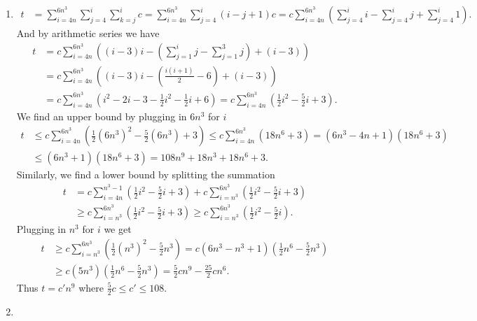 \documentclass[10pt,oneside,reqno]{amsart}
\theoremstyle{plain}
\theoremstyle{definition}
\begin{document}
\begin{enumerate}[label=]
\begin{enumerate}
\item 

\begin{equation}
\begin{aligned}
t &= \sum_{i = 4n}^{6n^3}\sum_{j = 4}^{i}\sum_{k = j}^i c = \sum_{i = 4n}^{6n^3}\sum_{j = 4}^{i}(i - j + 1) c = c\sum_{i = 4n}^{6n^3}\left(\sum_{j = 4}^{i}i - \sum_{j = 4}^{i}j + \sum_{j = 4}^{i}1 \right).
\end{aligned}
\end{equation}
And by arithmetic series we have
\begin{equation}
\begin{aligned}
t &= c\sum_{i = 4n}^{6n^3}\left((i - 3)i - \left(\sum_{j = 1}^{i}j - \sum_{j = 1}^{3}j \right) + (i - 3) \right) \\
&= c\sum_{i = 4n}^{6n^3}\left((i - 3)i - \left(\frac{i(i + 1)}{2} - 6 \right) + (i - 3) \right) \\
&= c\sum_{i = 4n}^{6n^3}\left(i^2 - 2i - 3 - \frac{1}{2}i^2 - \frac{1}{2}i + 6 \right) = c\sum_{i = 4n}^{6n^3}\left(\frac{1}{2}i^2 - \frac{5}{2}i + 3 \right).
\end{aligned}
\end{equation}
We find an upper bound by plugging in $6n^3$ for $i$
\begin{equation}
\begin{aligned}
t &\leq c\sum_{i = 4n}^{6n^3}\left(\frac{1}{2}(6n^3)^2 - \frac{5}{2}(6n^3) + 3 \right) \leq c\sum_{i = 4n}^{6n^3}\left(18n^6 + 3 \right) = (6n^3 - 4n + 1)(18n^6 + 3)\\
&\leq (6n^3 + 1)(18n^6 + 3) = \boxed{108n^9 }+ 18n^3 + 18n^6 + 3.
\end{aligned}
\end{equation}
Similarly, we find a lower bound by splitting the summation
\begin{equation}
\begin{aligned}
t &= c\sum_{i = 4n}^{n^3 - 1}\left(\frac{1}{2}i^2 - \frac{5}{2}i + 3 \right)  + c\sum_{i = n^3}^{6n^3}\left(\frac{1}{2}i^2 - \frac{5}{2}i + 3 \right)\\
&\geq c\sum_{i = n^3}^{6n^3}\left(\frac{1}{2}i^2 - \frac{5}{2}i + 3 \right) \geq c\sum_{i = n^3}^{6n^3}\left(\frac{1}{2}i^2 - \frac{5}{2}i \right).
\end{aligned}
\end{equation}
Plugging in $n^3$ for $i$ we get
\begin{equation}
\begin{aligned}
t &\geq c\sum_{i = n^3}^{6n^3}\left(\frac{1}{2}(n^3)^2 - \frac{5}{2}n^3 \right) = c(6n^3 - n^3 + 1)\left(\frac{1}{2}n^6 - \frac{5}{2}n^3 \right)\\
&\geq c(5n^3)\left(\frac{1}{2}n^6 - \frac{5}{2}n^3 \right) = \boxed{\frac{5}{2}cn^9} - \frac{25}{2}cn^6.
\end{aligned}
\end{equation}
Thus $\boxed{t = c'n^9}$ where $\frac{5}{2}c \leq c' \leq 108$. 
\item 


\end{enumerate}
\end{enumerate}
\end{document}
